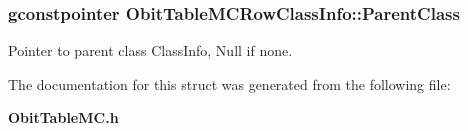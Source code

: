 \subsubsection{\setlength{\rightskip}{0pt plus 5cm}gconstpointer {\bf Obit\-Table\-MCRow\-Class\-Info::Parent\-Class}}\label{structObitTableMCRowClassInfo_o3}


Pointer to parent class Class\-Info, Null if none. 



The documentation for this struct was generated from the following file:\begin{CompactItemize}
\item 
{\bf Obit\-Table\-MC.h}\end{CompactItemize}
